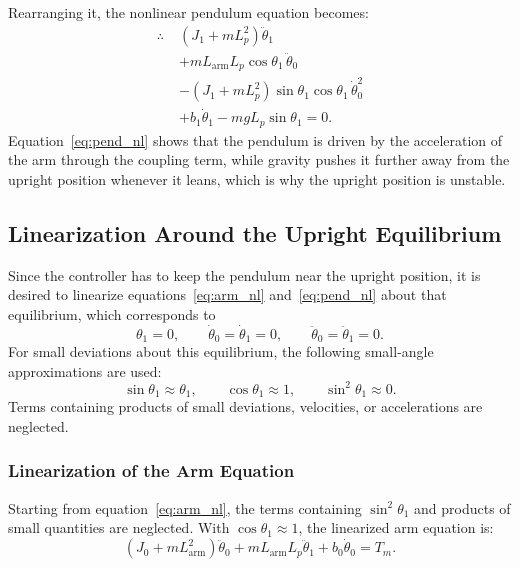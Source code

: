 \documentclass[a4paper,11pt]{article}
\newcommand{\La}{L_{\mathrm{arm}}}
\begin{document}
Rearranging it, the nonlinear pendulum equation becomes:
\begin{equation}
\begin{aligned}
  \therefore\; & \left(J_1 + m L_p^2\right)\ddot\theta_1\\
  & + m \La L_p \cos\theta_1\,\ddot\theta_0\\
  & - \left(J_1 + m L_p^2\right)\sin\theta_1 \cos\theta_1\,\dot\theta_0^2\\
  & + b_1 \dot\theta_1 - m g L_p \sin\theta_1 = 0 .
\end{aligned}
\label{eq:pend_nl}
\end{equation}
Equation~\ref{eq:pend_nl} shows that the pendulum is driven by the acceleration of the arm through the coupling term, while gravity pushes it further away from the upright position whenever it leans, which is why the upright position is unstable.

\subsection{Linearization Around the Upright Equilibrium}
Since the controller has to keep the pendulum near the upright position, it is desired to linearize equations~\ref{eq:arm_nl} and~\ref{eq:pend_nl} about that equilibrium, which corresponds to
\begin{equation}
  \theta_1 = 0, \qquad \dot\theta_0 = \dot\theta_1 = 0, \qquad \ddot\theta_0 = \ddot\theta_1 = 0 .
\end{equation}
For small deviations about this equilibrium, the following small-angle approximations are used:
\begin{equation}
  \sin\theta_1 \approx \theta_1, \qquad \cos\theta_1 \approx 1, \qquad \sin^2\theta_1 \approx 0 .
\end{equation}
Terms containing products of small deviations, velocities, or accelerations are neglected.

\subsubsection{Linearization of the Arm Equation}
Starting from equation~\ref{eq:arm_nl}, the terms containing $\sin^2\theta_1$ and products of small quantities are neglected. With $\cos\theta_1 \approx 1$, the linearized arm equation is:
\begin{equation}
  \left(J_0 + m \La^2\right)\ddot\theta_0 + m \La L_p \ddot\theta_1 + b_0 \dot\theta_0 = T_m .
\end{equation}
\end{document}
